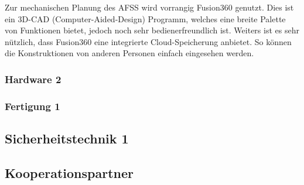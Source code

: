 Zur mechanischen Planung des AFSS wird vorrangig Fusion360 genutzt. Dies ist ein 3D-CAD (Computer-Aided-Design) Programm, welches eine breite Palette von Funktionen bietet, jedoch noch sehr bedienerfreundlich ist. Weiters ist es sehr nützlich, dass Fusion360 eine integrierte Cloud-Speicherung anbietet. So können die Konstruktionen von anderen Personen einfach eingesehen werden. 

\subsubsection{Hardware 2}

\subsubsection{Fertigung 1}

\subsection{Sicherheitstechnik 1}

\subsection{Kooperationspartner}